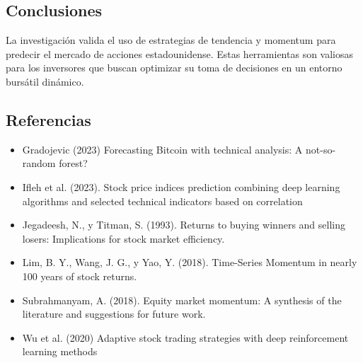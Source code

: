 \documentclass[a0,portrait]{a0poster}
\newcommand{\customsection}[1]{
    \begin{center}
        \begin{tcolorbox}[colframe=miRojo!50, colback=miRojo, width=\linewidth, boxrule=1mm, arc=3mm, auto outer arc]
            \centering
            \vspace{.5cm} %
            \color{white}
            \section*{ \textbf{\Huge #1}}  %
            \vspace{.5cm} %
        \end{tcolorbox}
    \end{center}
}
\begin{document}
\begin{multicols}{2}

    \customsection{Conclusiones}
    \par
    \indent La investigación valida el uso de estrategias de tendencia y momentum para predecir el mercado de acciones 
    estadounidense. Estas herramientas son valiosas para los inversores que buscan optimizar su toma de decisiones en un 
    entorno bursátil dinámico. 
    \customsection{Referencias}
    \par
         \begin{itemize}
            \item Gradojevic (2023) Forecasting Bitcoin with technical analysis: A not-so-random forest?
            \item Ifleh et al. (2023). Stock price indices prediction combining deep learning algorithms and selected technical 
            indicators based on correlation
            \item Jegadeesh, N., y Titman, S. (1993). Returns to buying winners and selling losers: Implications for stock 
            market efficiency.
            \item Lim, B. Y., Wang, J. G., y Yao, Y. (2018). Time-Series Momentum in nearly 100 years of stock returns.            
            \item Subrahmanyam, A. (2018). Equity market momentum: A synthesis of the literature and suggestions for future work.
            \item Wu et al. (2020) Adaptive stock trading strategies with deep reinforcement learning methods
        \end{itemize}
        
    
    
    
    
\end{multicols}
\end{document}
